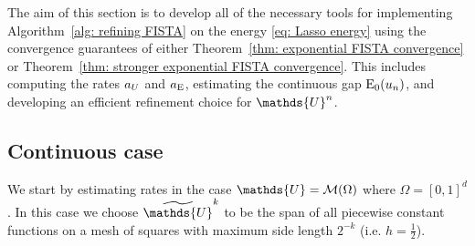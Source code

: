 \documentclass[smallextended]{svjour3}
\let\F\mathds\let\C\mathcal\newcommand{\R}{\F{R}}\newcommand{\A}{\tens{A}}
\newcommand{\op}[1]{\operatorname{#1}}
\newcommand{\1}{\F{1}}
\newcommand*{\varf}[1]{%
	\IfEqCase{#1}{%
		{0}{u}%
		{1}{v}%
		{2}{w}%
	}[u#1]%
}
\newcommand*{\Varf}[1]{%
	\IfEqCase{#1}{%
		{0}{U}%
		{1}{V}%
		{2}{W}%
	}[u#1]%
}
\newcommand*{\spcf}[1]{%
	\IfEqCase{#1}{%
		{0}{\F{U}}%
		{1}{\F{V}}%
		{2}{\F{W}}%
	}[\F{U}#1]%
}
\newcommand*{\vars}[1]{%
	\IfEqCase{#1}{%
		{0}{\alpha}%
		{1}{\beta}%
		{2}{\gamma}%
		{3}{a}%
		{4}{b}%
		{5}{c}%
	}[k#1]%
}
\newcommand{\Domain}{\Omega}\newcommand{\domain}{\omega}
\newcommand{\meshsize}{h}
\begin{document}
	The aim of this section is to develop all of the necessary tools for implementing Algorithm~\ref{alg: refining FISTA} on the energy \eqref{eq: Lasso energy} using the convergence guarantees of either Theorem~\ref{thm: exponential FISTA convergence} or Theorem~\ref{thm: stronger exponential FISTA convergence}. This includes computing the rates $\vars3_{\Varf0}$ and $\vars3_{\op{E}}$, estimating the continuous gap $\op{E}_0(\varf0_n)$, and developing an efficient refinement choice for $\spcf0^n$.
	
	\subsection{Continuous case}\label{sec: continuous lasso rate}
	We start by estimating rates in the case $\spcf0=\C M(\Domain)$ where $\Domain =[0,1]^d$. In this case we choose $\tilde{\spcf0}^k$ to be the span of all piecewise constant functions on a mesh of squares with maximum side length $2^{-k}$ (i.e. $\meshsize=\tfrac12$). 
	
\end{document}
